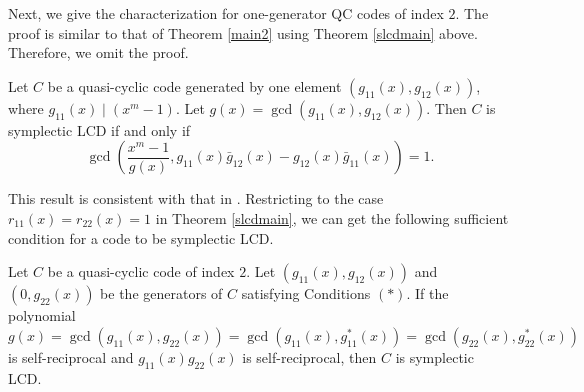 \documentclass[a4paper,12pt]{article}
\begin{document}

Next, we give the characterization for one-generator QC codes of index $2$. The proof is similar to that of Theorem \ref{main2} using  Theorem \ref{slcdmain} above. Therefore, we omit the proof.
\begin{theorem} \label{slcd1}  
Let $C$ be a quasi-cyclic code generated by one element $(g_{11}(x),g_{12}(x))$, where $g_{11}(x)\mid (x^m-1)$. Let $g(x)=\gcd(g_{11}(x),g_{12}(x))$. Then $C$ is symplectic LCD if and only if 
	\begin{equation} 
		\gcd \left(\dfrac{x^m-1}{g(x)},  g_{11}(x)\bar{g}_{12}(x)-g_{12}(x) \bar{g}_{11}(x)\right)=1.
	\end{equation}
\end{theorem} 

This result is consistent with that in  \cite{guan2023}. 
Restricting to the case $r_{11}(x)=r_{22}(x)=1$ in Theorem \ref{slcdmain}, we can get the following sufficient condition for a code to be symplectic LCD. 
\begin{corollary} \label{cor-sympl} 
Let $C$ be a quasi-cyclic code  of index $2$. Let $(g_{11}(x), g_{12}(x))$ and $(0, g_{22}(x))$ be the generators of $C$ satisfying Conditions $(\ast)$. If the polynomial $g(x) = \gcd(g_{11}(x),g_{22}(x)) = \gcd(g_{11}(x),g_{11}^*(x)) = \gcd(g_{22}(x),g_{22}^*(x))$ is self-reciprocal and $g_{11}(x)g_{22}(x)$ is self-reciprocal, then $C$ is symplectic LCD.    
\end{corollary}
\end{document}

